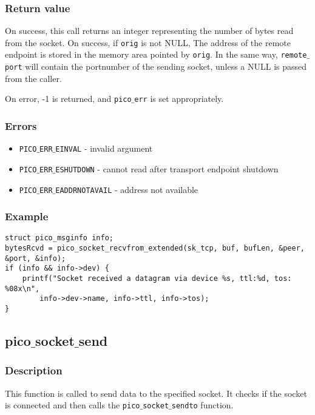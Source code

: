 \subsubsection*{Return value}
On success, this call returns an integer representing the number of bytes read from the socket. On success, if \texttt{orig}
is not NULL, The address of the remote endpoint is stored in the memory area pointed by \texttt{orig}. 
In the same way, \texttt{remote$\_$port} will contain the portnumber of the sending socket, unless a NULL is passed
from the caller.

On error, -1 is returned, and \texttt{pico$\_$err} is set appropriately.

\subsubsection*{Errors}
\begin{itemize}[noitemsep]
\item \texttt{PICO$\_$ERR$\_$EINVAL} - invalid argument
\item \texttt{PICO$\_$ERR$\_$ESHUTDOWN} - cannot read after transport endpoint shutdown
\item \texttt{PICO$\_$ERR$\_$EADDRNOTAVAIL} - address not available
\end{itemize}

\subsubsection*{Example}
\begin{verbatim}
struct pico_msginfo info;
bytesRcvd = pico_socket_recvfrom_extended(sk_tcp, buf, bufLen, &peer, &port, &info);
if (info && info->dev) {
    printf("Socket received a datagram via device %s, ttl:%d, tos: %08x\n", 
        info->dev->name, info->ttl, info->tos);
}
\end{verbatim}


\subsection{pico$\_$socket$\_$send}

\subsubsection*{Description}
This function is called to send data to the specified socket.
It checks if the socket is connected and then calls the
\texttt{pico$\_$socket$\_$sendto} function.

